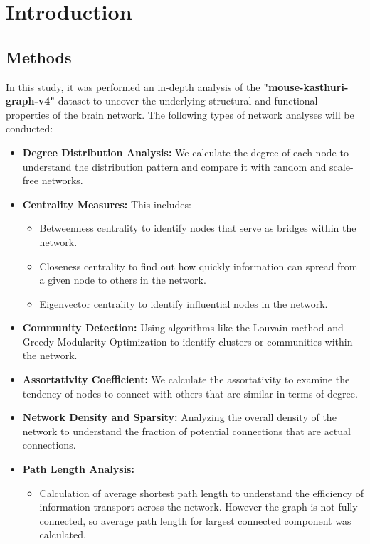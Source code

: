\documentclass[
	report, %
	11pt, %
]{CSUniSchoolLabReport}
\begin{document}
\section{Introduction}
	\subsection{Methods}
		In this study, it was performed an in-depth analysis of the \textbf{"mouse-kasthuri-graph-v4"} dataset to uncover the underlying structural and functional properties of the brain network. The following types of network analyses will be conducted:
		\vspace{10pt}
		\begin{itemize}
		\item \textbf{Degree Distribution Analysis:} We calculate the degree of each node to understand the distribution pattern and compare it with random and scale-free networks.
		\item \textbf{Centrality Measures:} This includes:
		\begin{itemize}
			\item Betweenness centrality to identify nodes that serve as bridges within the network.
			\item Closeness centrality to find out how quickly information can spread from a given node to others in the network.
			\item Eigenvector centrality to identify influential nodes in the network.
		\end{itemize}
		\item \textbf{Community Detection:} Using algorithms like the Louvain method and Greedy Modularity Optimization to identify clusters or communities within the network.
		\item \textbf{Assortativity Coefficient:} We calculate the assortativity to examine the tendency of nodes to connect with others that are similar in terms of degree.
		\item \textbf{Network Density and Sparsity:} Analyzing the overall density of the network to understand the fraction of potential connections that are actual connections.
		\item \textbf{Path Length Analysis:}
		\begin{itemize}
			\item Calculation of average shortest path length to understand the efficiency of information transport across the network. However the graph is not fully connected, so average path length for largest connected component was calculated.

\end{itemize}
\end{itemize}
\end{document}
